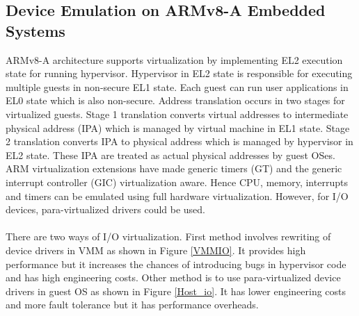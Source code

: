 \subsection{Device Emulation on ARMv8-A Embedded Systems\label{sec:3gpp}}
ARMv8-A architecture supports virtualization by implementing EL2 execution state for running hypervisor. Hypervisor in EL2 state is responsible for executing multiple guests in non-secure EL1 state. Each guest can run user applications in EL0 state which is also non-secure. Address translation occurs in two stages for virtualized guests. Stage 1 translation converts virtual addresses to intermediate physical address (IPA) which is managed by virtual machine in EL1 state. Stage 2 translation converts IPA to physical address which is managed by hypervisor in EL2 state. These IPA are treated as actual physical addresses by guest OSes. ARM virtualization extensions have made generic timers (GT) and the generic interrupt controller (GIC) virtualization aware. Hence CPU, memory, interrupts and timers can be emulated using full hardware virtualization. However, for I/O devices, para-virtualized drivers could be used.\\
\\
There are two ways of I/O virtualization. First method involves rewriting of device drivers in VMM as shown in Figure \ref{VMMIO}. It provides high performance but it increases the chances of introducing bugs in hypervisor code and has high engineering costs. Other method is to use para-virtualized device drivers in guest OS as shown in Figure \ref{Host_io}. It has lower engineering costs and more fault tolerance but it has performance overheads.




